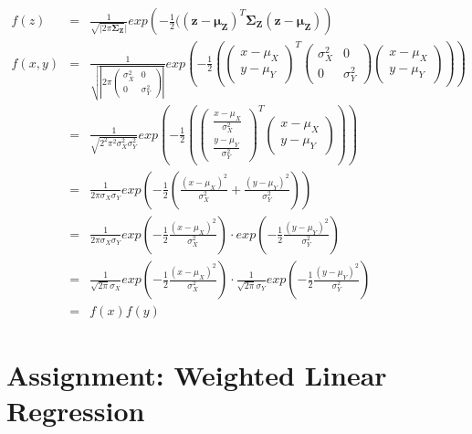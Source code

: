 \documentclass{article}
\renewcommand{\Vec}[1]{\ensuremath{\mathbf{#1}}}
\newcommand{\Mtx}[1]{\ensuremath{\mathbf{#1}}}
\begin{document}
\begin{eqnarray}
f(z) &=& \frac{1}{\sqrt{|2\pi \Mtx{\Sigma_Z}}|} exp\left(-\frac{1}{2} ((\Vec{z}-\Vec{\mu_Z})^T \Mtx{\Sigma_Z} (\Vec{z}-\Vec{\mu_Z})\right)\\
f(x,y) &=& \frac{1}{\sqrt{\left|2\pi \left( \begin{array}{cc}
\sigma_X^2 & 0\\
0 & \sigma_Y^2
\end{array} \right) \right| }}
 exp\left(-\frac{1}{2} \left( \left( \begin{array}{c} x-\mu_X \\y-\mu_Y \end{array} \right)^T 
 \left( \begin{array}{cc}
\sigma_X^2 & 0\\
0 & \sigma_Y^2
\end{array} \right)
 \left( \begin{array}{c} x-\mu_X \\y-\mu_Y \end{array} \right) \right) \right)\\
 &=& \frac{1}{\sqrt{2^2\pi^2 \sigma_X^2 \sigma_Y^2}}
 exp\left(-\frac{1}{2} \left( \left( \begin{array}{c} \frac{x-\mu_X}{\sigma_X^2} \\ \frac{y-\mu_Y}{\sigma_Y^2} \end{array} \right)^T 
 \left( \begin{array}{c} x-\mu_X \\y-\mu_Y \end{array} \right) \right) \right)\\
 &=& \frac{1}{2\pi \sigma_X \sigma_Y}
 exp\left(-\frac{1}{2} \left( \frac{(x-\mu_X)^2}{\sigma_X^2} + \frac{(y-\mu_Y)^2}{\sigma_Y^2} \right) \right)\\
 &=& \frac{1}{2\pi \sigma_X \sigma_Y}
 exp\left(-\frac{1}{2} \frac{(x-\mu_X)^2}{\sigma_X^2}\right) \cdot exp\left(-\frac{1}{2} \frac{(y-\mu_Y)^2}{\sigma_Y^2} \right)\\
 &=& \frac{1}{\sqrt{2\pi} \sigma_X}
 exp\left(-\frac{1}{2} \frac{(x-\mu_X)^2}{\sigma_X^2}\right) \cdot \frac{1}{\sqrt{2\pi} \sigma_Y} exp\left(-\frac{1}{2} \frac{(y-\mu_Y)^2}{\sigma_Y^2} \right)\\
 &=& f(x)f(y)
\end{eqnarray}


\section{Assignment: Weighted Linear Regression}
\end{document}

